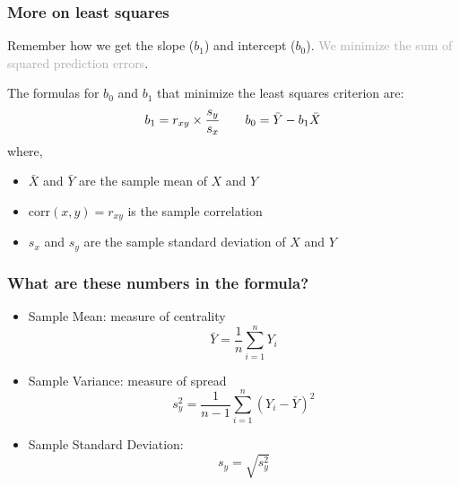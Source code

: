 \documentclass{beamer}
\newcommand{\bo}[1]{\textcolor{burntorange}{#1}}
\newcommand{\lb}[1]{\textcolor{lightblue}{#1}}
\newcommand{\dg}[1]{\textcolor{darkgray}{#1}}
\newcommand{\sk}{\vspace{.5cm}}
\begin{document}
\begin{frame}
\frametitle{More on least squares}
Remember how we get the slope (\bo{$b_1$}) and intercept (\bo{$b_0$}).  \dg{We minimize the sum of squared prediction errors}.

\sk
The formulas for $b_0$ and $b_1$ that minimize the least squares criterion are:
{\lb{ \Large
$$
b_1 = r_{xy} \times \frac{s_y}{s_x}  \quad \mbox \quad b_0 = \bar{Y} - b_1 \bar{X}
$$
}}
where,

\begin{itemize}
\item $\bar{X}$ and $\bar{Y}$ are the sample mean of $X$ and $Y$
\item $\text{corr}(x,y) = r_{xy}$ is the sample correlation
\item $s_x$ and $s_y$ are the sample standard deviation of $X$ and $Y$
\end{itemize}



\end{frame}


\begin{frame}
\frametitle{What are these numbers in the formula?}

\begin{itemize}
\item {\color{lightblue} Sample Mean:}  measure of \bo{centrality}
$$
\bar{Y} = \frac{1}{n}\sum^{n}_{i=1}{Y_i }
$$ 

\item {\color{lightblue} Sample Variance}: measure of \bo{spread} 
$$
s^2_y= \frac{1}{n-1}\sum^{n}_{i=1}{\left(Y_i - \bar{Y}\right)^2 }
$$ 

\item {\color{lightblue} Sample Standard Deviation}:
$$
s_y= \sqrt{s^2_y} 
$$ 


\end{itemize} 
\end{frame}
\end{document}
